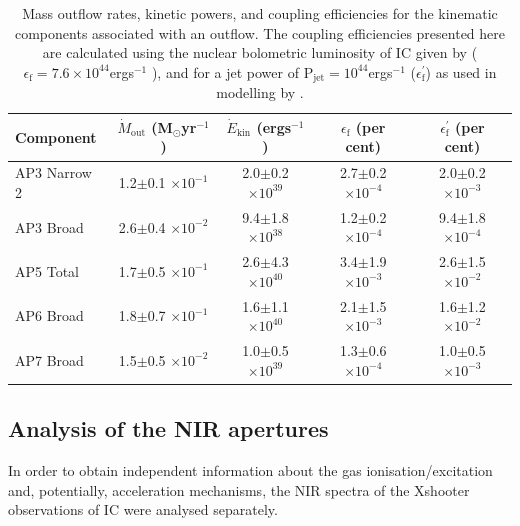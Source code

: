 \begin{table}[!t]
	\renewcommand{\arraystretch}{1.5}
	\begin{tabular}{lcccc}
	Component    & $\dot{M}_\mathrm{out}$ (M$_\odot$yr$^{-1}$) & $\dot{E}_\mathrm{kin}$ (erg\;s$^{-1}$) & $\epsilon_\mathrm{f}$ (per cent) & $\epsilon_\mathrm{f}^\prime$ (per cent) \\ \hline
	AP3 Narrow 2 & 1.2$\pm$0.1 $\times 10^{-1}$              & 2.0$\pm$0.2 $\times10^{39}$  & 2.7$\pm$0.2 $\times 10^{-4}$   & 2.0$\pm$0.2 $\times 10^{-3}$          \\
	AP3 Broad    & 2.6$\pm$0.4 $\times10^{-2}$               & 9.4$\pm$1.8 $\times10^{38}$  & 1.2$\pm$0.2 $\times 10^{-4}$   & 9.4$\pm$1.8 $\times 10^{-4}$          \\ 
	AP5 Total    & 1.7$\pm$0.5 $\times 10^{-1}$               & 2.6$\pm$4.3 $\times10^{40}$  & 3.4$\pm$1.9 $\times 10^{-3}$   & 2.6$\pm$1.5 $\times 10^{-2}$          \\ 
	AP6 Broad    & 1.8$\pm$0.7 $\times 10^{-1}$              & 1.6$\pm$1.1 $\times10^{40}$  & 2.1$\pm$1.5 $\times 10^{-3}$   & 1.6$\pm$1.2 $\times 10^{-2}$          \\ 
	AP7 Broad    & 1.5$\pm$0.5 $\times 10^{-2}$              & 1.0$\pm$0.5 $\times10^{39}$  & 1.3$\pm$0.6 $\times 10^{-4}$   & 1.0$\pm$0.5 $\times 10^{-3}$          \\
	\end{tabular}
	\caption[Energetics for the warm ionised outflows in IC.]{Mass outflow rates, kinetic powers, and coupling efficiencies for the kinematic components associated with an outflow. The coupling efficiencies presented here are calculated using the nuclear bolometric luminosity of IC given by \citet{Nicastro2003} ($\epsilon_\mathrm{f}=7.6\times 10^{44}$\;erg\;s$^{-1}$ ), and for a jet power of P$_\mathrm{jet} = 10^{44}$\;erg\;s$^{-1}$ ($\epsilon^\prime_\mathrm{f}$) as used in modelling by \citet{Mukherjee2018}.}
	\label{tab: xshooter_ic5063: mout_fkin}
\end{table}


\newpage
\subsection{Analysis of the NIR apertures}
\label{section: xshooter_ic5063: properties_of_outflowing_gas: nir_analysis_and_results}

In order to obtain independent information about the gas ionisation/excitation and, potentially, acceleration mechanisms, the NIR spectra of the Xshooter observations of IC were analysed separately.

